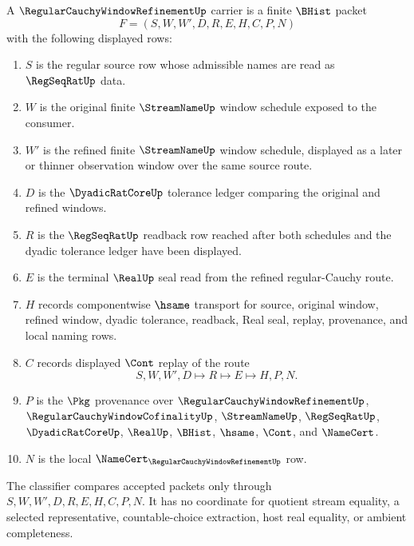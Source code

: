 \begin{definition}
\label{def:regular-cauchy-window-refinement-carrier}
A $\RegularCauchyWindowRefinementUp$ carrier is a finite $\BHist$ packet
$$
F=(S,W,W',D,R,E,H,C,P,N)
$$
with the following displayed rows:
\begin{enumerate}
\item $S$ is the regular source row whose admissible names are read as $\RegSeqRatUp$ data.
\item $W$ is the original finite $\StreamNameUp$ window schedule exposed to the consumer.
\item $W'$ is the refined finite $\StreamNameUp$ window schedule, displayed as a later or thinner observation window over the same source route.
\item $D$ is the $\DyadicRatCoreUp$ tolerance ledger comparing the original and refined windows.
\item $R$ is the $\RegSeqRatUp$ readback row reached after both schedules and the dyadic tolerance ledger have been displayed.
\item $E$ is the terminal $\RealUp$ seal read from the refined regular-Cauchy route.
\item $H$ records componentwise $\hsame$ transport for source, original window, refined window, dyadic tolerance, readback, Real seal, replay, provenance, and local naming rows.
\item $C$ records displayed $\Cont$ replay of the route
$$
S,W,W',D \longmapsto R \longmapsto E \longmapsto H,P,N .
$$
\item $P$ is the $\Pkg$ provenance over $\RegularCauchyWindowRefinementUp$, $\RegularCauchyWindowCofinalityUp$, $\StreamNameUp$, $\RegSeqRatUp$, $\DyadicRatCoreUp$, $\RealUp$, $\BHist$, $\hsame$, $\Cont$, and $\NameCert$.
\item $N$ is the local $\NameCert_{\RegularCauchyWindowRefinementUp}$ row.
\end{enumerate}
The classifier compares accepted packets only through $S,W,W',D,R,E,H,C,P,N$. It has no coordinate for quotient stream equality, a selected representative, countable-choice extraction, host real equality, or ambient completeness.
\end{definition}

